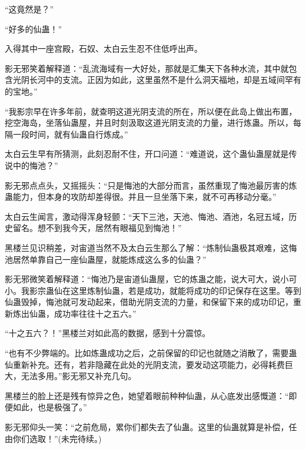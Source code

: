 \begin{this_body}
“这竟然是？”

“好多的仙蛊！”

入得其中一座宫殿，石奴、太白云生忍不住低呼出声。

影无邪笑着解释道：“乱流海域有一大好处，那就是汇集天下各种水流，其中就包含光阴长河中的支流。正因为如此，这里虽然不是什么洞天福地，却是五域间罕有的宝地。”

“我影宗早在许多年前，就查明这道光阴支流的所在，所以便在此岛上做出布置，挖空海岛，坐落仙蛊屋，并且时刻汲取这道光阴支流的力量，进行炼蛊。所以，每隔一段时间，就有仙蛊自行炼成。”

太白云生早有所猜测，此刻忍耐不住，开口问道：“难道说，这个蛊仙蛊屋就是传说中的悔池？”

影无邪点点头，又摇摇头：“只是悔池的大部分而言，虽然重现了悔池最厉害的炼蛊能力，但本身的攻防却差得很。并且一旦坐落下来，就不可再移动分毫。”

太白云生闻言，激动得浑身轻颤：“天下三池，天池、悔池、酒池，名冠五域，历史留名。想不到我今天，居然有眼福见到悔池！”

黑楼兰见识稍差，对宙道当然不及太白云生那么了解：“炼制仙蛊极其艰难，这悔池居然单靠自己一座仙蛊屋，就能炼成这么多的仙蛊？”

影无邪微笑着解释道：“悔池乃是宙道仙蛊屋，它的炼蛊之能，说大可大，说小可小。我影宗蛊仙在这里炼制仙蛊，若是成功，就能将成功的印记保存在这里。等到仙蛊毁掉，悔池就可发动起来，借助光阴支流的力量，和保留下来的成功印记，重新炼出仙蛊，成功率往往十之五六。”

“十之五六？！”黑楼兰对如此高的数据，感到十分震惊。

“也有不少弊端的。比如炼蛊成功之后，之前保留的印记也就随之消散了，需要蛊仙重新补充。还有，若非隐藏在此处的光阴支流，要发动这项能力，必得耗费巨大，无法多用。”影无邪又补充几句。

黑楼兰的脸上还是残有惊异之色，她望着眼前种种仙蛊，从心底发出感慨道：“即便如此，也是极强了。”

影无邪仰头一笑：“之前危局，累你们都失去了仙蛊。这里的仙蛊就算是补偿，任由你们选取！”(未完待续。)

\end{this_body}

